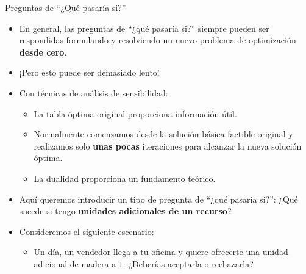 \documentclass{beamer}
\begin{document}
\begin{frame}{Preguntas de “¿Qué pasaría si?”}
    \begin{itemize}
        \item En general, las preguntas de “¿qué pasaría si?” siempre pueden ser respondidas formulando y resolviendo un nuevo problema de optimización \textbf{desde cero}.
    \end{itemize}

    \begin{itemize}
        \item ¡Pero esto puede ser demasiado lento!
    \end{itemize}

    \begin{itemize}
        \item Con técnicas de análisis de sensibilidad:
        \begin{itemize}
            \item La tabla óptima original proporciona información útil.
            \item Normalmente comenzamos desde la solución básica factible original y realizamos solo \textbf{unas pocas} iteraciones para alcanzar la nueva solución óptima.
            \item La dualidad proporciona un fundamento teórico.
        \end{itemize}
    \end{itemize}
    
    \begin{itemize}
        \item Aquí queremos introducir un tipo de pregunta de “¿qué pasaría si?”: ¿Qué sucede si tengo \textbf{unidades adicionales de un recurso}?
    \end{itemize}

    \begin{itemize}
        \item Consideremos el siguiente escenario:
        \begin{itemize}
            \item Un día, un vendedor llega a tu oficina y quiere ofrecerte una unidad adicional de madera a $1$. ¿Deberías aceptarla o rechazarla?
        \end{itemize}
    \end{itemize}
\end{frame}
\end{document}
